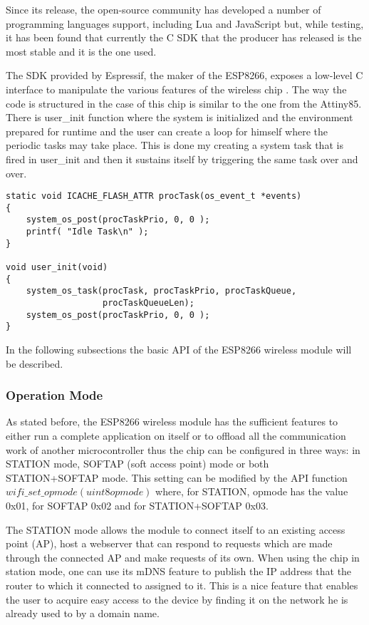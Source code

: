 Since its release, the open-source community has developed a number of programming languages support,
including  Lua \cite{website:nodemcu} and JavaScript \cite{website:espruino} but, while testing, it has been
found that currently the C SDK that the producer has released is the most stable and it is the one used.

\qquad The SDK provided by Espressif, the maker of the ESP8266, exposes a low-level C interface to manipulate the
various features of the wireless chip \cite{datasheet:esp8266_api}.
The way the code is structured in the case of this chip is similar to the one from the Attiny85. There is
user\_init function where the system is initialized and the environment prepared for runtime and the user
can create a loop for himself where the periodic tasks may take place.
This is done my creating a system task that is fired in user\_init and then it sustains itself by triggering
the same task over and over.

\lstset{language=C}
\begin{lstlisting}[frame=single]
static void ICACHE_FLASH_ATTR procTask(os_event_t *events)
{
    system_os_post(procTaskPrio, 0, 0 );
    printf( "Idle Task\n" );
}

void user_init(void)
{
    system_os_task(procTask, procTaskPrio, procTaskQueue,
                   procTaskQueueLen);
    system_os_post(procTaskPrio, 0, 0 );
}
\end{lstlisting}

In the following subsections the basic API of the ESP8266 wireless module will be described.

\subsubsection{Operation Mode}
\label{sec:opmode}

\qquad As stated before, the ESP8266 wireless module has the sufficient features to either run a complete application
on itself or to offload all the communication work of another microcontroller thus the chip can be configured
in  three ways: in STATION mode, SOFTAP (soft access point) mode or both STATION+SOFTAP mode.
This setting can be modified by the API function $wifi\_set\_opmode(uint8 opmode)$ where, for STATION, opmode
has the value 0x01, for SOFTAP 0x02 and for STATION+SOFTAP 0x03.

\qquad The STATION mode allows the module to connect itself to an existing access point (AP), host a webserver that
can respond to requests which are made through the connected AP and make requests of its own. When using the
chip in station mode, one can use its mDNS feature to publish the IP address that the router to which it
connected to assigned to it. This is a nice feature that enables the user to acquire easy access to the device
by finding it on the network he is already used to by a domain name.

